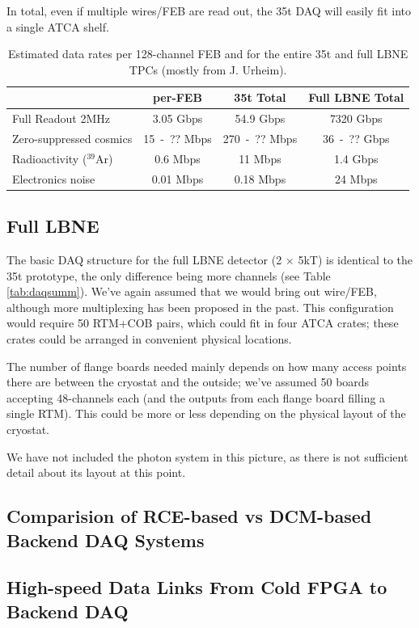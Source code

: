 In total, even if multiple wires/FEB are read out, the 35t DAQ will easily fit into a single ATCA shelf.  


\begin{table}[tbh]
\begin{center}
\begin{tabular}{|l|c|c|c|}   
\hline \hline 
    											&    per-FEB               &       35t   Total   & Full LBNE  Total \\      
\hline
   Full Readout 2MHz  			  & 3.05 Gbps & 54.9 Gbps  &  7320 Gbps \\ 
   Zero-suppressed cosmics  & 15~-~?? Mbps& 270~-~?? Mbps  &  36~-~??  Gbps\\ 
  Radioactivity  ($^{39}$Ar)    & 0.6 Mbps&  11 Mbps  &   1.4 Gbps \\
   Electronics noise& 0.01 Mbps & 0.18 Mbps&  24 Mbps\\ 
\hline \hline
\end{tabular}
\caption[]{Estimated data rates per 128-channel FEB and for the entire 35t and full LBNE TPCs  (mostly from J. Urheim).}
\label{tab:datarates} 
\end{center}
\end{table}

\subsection{Full LBNE}

The basic DAQ structure for the full LBNE detector (2 $\times$ 5kT) is identical to the 35t prototype, the only difference being more channels (see Table \ref{tab:daqsumm}).  We've again assumed that we would bring out wire/FEB, although more multiplexing has been proposed in the past.  This configuration would require 50 RTM+COB pairs, which could fit in four ATCA crates; these crates could be arranged in convenient physical locations.  

The number of flange boards needed mainly depends on how many access points there are between the cryostat and the outside;  we've assumed 50 boards accepting 48-channels each (and the outputs from each flange board filling a single RTM).  This could be more or less depending on the physical layout of the cryostat.  

We have not included the photon system in this picture, as there is not sufficient detail about its layout at this point. 

\subsection{Comparision of RCE-based vs DCM-based Backend DAQ Systems}






\subsection{High-speed Data Links From Cold FPGA to Backend DAQ}



